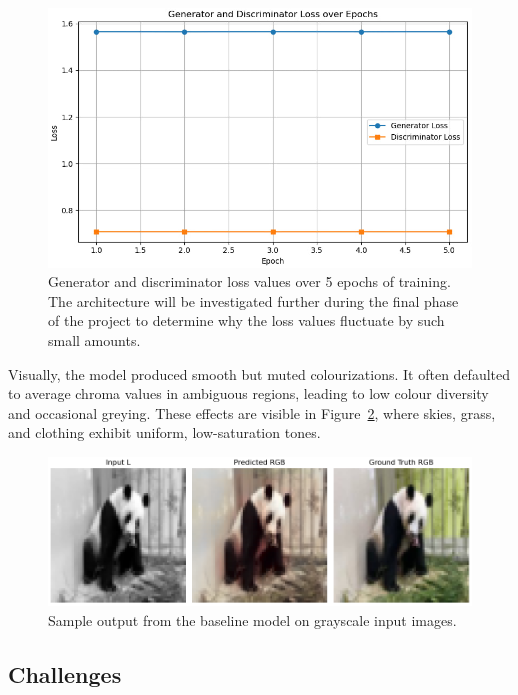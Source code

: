 \documentclass{article} %
\begin{document}
\begin{figure}[htbp]
    \centering
    \includegraphics[width=\textwidth]{Figs/baseline_learning_curve.jpg}
    \caption{Generator and discriminator loss values over 5 epochs of training. The architecture will be investigated further during the final phase of the project to determine why 
    the loss values fluctuate by such small amounts.}

    \label{fig:baseline_outputs}
\end{figure}

Visually, the model produced smooth but muted colourizations. It often defaulted to average chroma values in ambiguous regions, leading to low colour diversity and occasional greying. These effects are visible in Figure~\ref{fig:baseline_outputs}, where skies, grass, and clothing exhibit uniform, low-saturation tones.

\begin{figure}[htbp]
    \centering
    \includegraphics[width=\textwidth]{Figs/baseline_output.png}
    \caption{Sample output from the baseline model on grayscale input images.}
    \label{fig:baseline_outputs}
\end{figure}

\subsection{Challenges}
\end{document}
